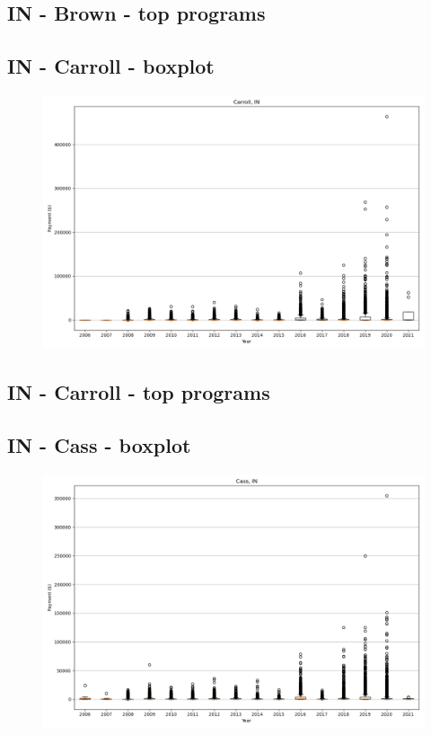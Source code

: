 \subsection*{IN - Brown - top programs}

\newpage
\subsection*{IN - Carroll - boxplot}
\begin{figure}[h]
\centering
\includegraphics[width=7in]{../output/boxplots/counties/Carroll-IN_boxplot.png}
\end{figure}


\subsection*{IN - Carroll - top programs}

\newpage
\subsection*{IN - Cass - boxplot}
\begin{figure}[h]
\centering
\includegraphics[width=7in]{../output/boxplots/counties/Cass-IN_boxplot.png}
\end{figure}


